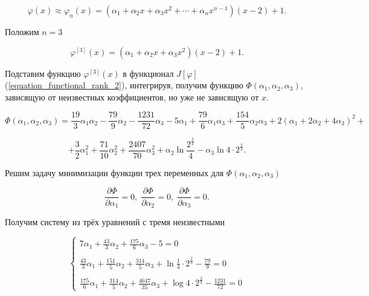 \documentclass{article}
\begin{document}
\begin{equation}
	\varphi(x) \approx \varphi_{n}(x) = (\alpha_{1} + \alpha_{2}x + \alpha_{3}x^2 + \cdots + \alpha_{n}x^{n-1})(x-2)+1.
\end{equation}

\noindent Положим $n = 3$

\begin{equation}
	\varphi^{[3]}(x) = (\alpha_{1} + \alpha_{2}x + \alpha_{3}x^2)(x-2)+1.
\end{equation}

\noindent Подставим функцию $\varphi^{[3]}(x)$ в функционал $J[\varphi]$ (\ref{equation_functional_rank_2}), интегрируя, получим функцию $\Phi(\alpha_{1}, \alpha_{2}, \alpha_{3})$, зависящую от неизвестных коэффициентов, но уже не зависящую от $x$.

\begin{displaymath}
	\Phi(\alpha_{1}, \alpha_{2}, \alpha_{3}) = \frac{19}{3}\alpha_{1}\alpha_{2} - \frac{79}{9}\alpha_{2} - \frac{1231}{72}\alpha_{3} - 5\alpha_{1} + \frac{79}{6}\alpha_{1}\alpha_{3} + \frac{154}{5}\alpha_{2}\alpha_{3} + 2(\alpha_{1} + 2 \alpha_{2} + 4\alpha_{3})^2 +
\end{displaymath}
	
\begin{equation}	
	 + \frac{3}{2}\alpha_{1}^{2} +  \frac{71}{10}\alpha_{2}^{2} + \frac{2407}{70}\alpha_{3}^{2} + \alpha_{2} \ln{\frac{2^{\frac{2}{3}}}{4}} - \alpha_{3} \ln{4 \cdot 2^{\frac{2}{3}}}.
\end{equation}

\noindent Решим задачу минимизации функции трех переменных для $\Phi(\alpha_{1}, \alpha_{2}, \alpha_{3})$

\begin{equation}
	\frac{\partial \Phi}{\partial \alpha_{1}} = 0, \;
	\frac{\partial \Phi}{\partial \alpha_{2}} = 0, \;
	\frac{\partial \Phi}{\partial \alpha_{3}} = 0.
\end{equation}

\noindent Получим систему из трёх уравнений с тремя неизвестными

\begin{equation}
	\begin{cases}
		7\alpha_{1} + \frac{43}{3}\alpha_{2} + \frac{175}{6}\alpha_{3} - 5 = 0 \\
		\\
		\frac{43}{3}\alpha_{1} + \frac{151}{5}\alpha_{2} + \frac{314}{5}\alpha_{3} + \ln{\frac{1}{4} \cdot 2^{\frac{2}{3}}} - \frac{79}{9} = 0 \\
		\\
		\frac{175}{6}\alpha_{1} + \frac{314}{5}\alpha_{2} + \frac{4647}{35}\alpha_{3} + \log{4 \cdot 2^{\frac{2}{3}}} - \frac{1231}{72} = 0
	\end{cases}
\end{equation}
\end{document}
